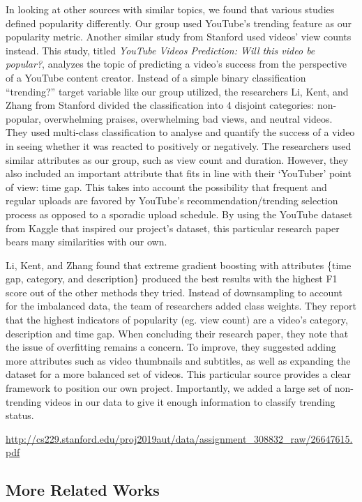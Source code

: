 \documentclass{article}
\begin{document}
\quad In looking at other sources with similar topics, we found that various studies defined popularity differently. Our group used YouTube’s trending feature as our popularity metric. Another similar study from Stanford used videos’ view counts instead. This study, titled \textit{YouTube Videos Prediction: Will this video be popular?}, analyzes the topic of predicting a video’s success from the perspective of a YouTube content creator. Instead of a simple binary classification “trending?” target variable like our group utilized, the researchers Li, Kent, and Zhang from Stanford divided the classification into 4 disjoint categories: non-popular, overwhelming praises, overwhelming bad views, and neutral videos. They used multi-class classification to analyse and quantify the success of a video in seeing whether it was reacted to positively or negatively. The researchers used similar attributes as our group, such as view count and duration. However, they also included an important attribute that fits in line with their ‘YouTuber’ point of view: time gap. This takes into account the possibility that frequent and regular uploads are favored by YouTube’s recommendation/trending selection process as opposed to a sporadic upload schedule. By using the YouTube dataset from Kaggle that inspired our project’s dataset, this particular research paper bears many similarities with our own.
\par Li, Kent, and Zhang found that extreme gradient boosting with attributes \{time gap, category, and description\} produced the best results with the highest F1 score out of the other methods they tried. Instead of downsampling to account for the imbalanced data, the team of researchers added class weights. They report that the highest indicators of popularity (eg. view count) are a video’s category, description and time gap. When concluding their research paper, they note that the issue of overfitting remains a concern. To improve, they suggested adding more attributes such as video thumbnails and subtitles, as well as expanding the dataset for a more balanced set of videos. This particular source provides a clear framework to position our own project. Importantly, we added a large set of non-trending videos in our data to give it enough information to classify trending status. \smallskip

\href{http://cs229.stanford.edu/proj2019aut/data/assignment_308832_raw/26647615.pdf}{http://cs229.stanford.edu/proj2019aut/data/assignment\_308832\_raw/26647615.pdf}

\subsection*{More Related Works}
\end{document}
